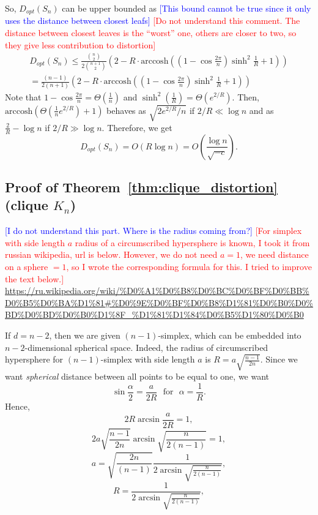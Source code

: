 \documentclass{article} %
\newcommand{\ph}[1]{\textcolor{blue}{#1}}
\newcommand{\lt}[1]{\textcolor{red}{#1}}
\begin{document}
So, $D_{opt}(S_n)$ can be upper bounded as \ph{[This bound cannot be true since it only uses the distance between closest leafs]} \lt{[Do not understand this comment. The distance between closest leaves is the ``worst'' one, others are closer to two, so they give less contribution to distortion]}
\begin{multline*}
D_{opt}(S_n) \le \frac{{n \choose 2}}{2{n+1\choose 2}} \left(2 - R\cdot \mathrm{arccosh}\left( \left(1 - \cos \frac{2 \pi}{n}\right)\sinh^2\frac{1}{R}  + 1 \right)\right) \\
= \frac{(n-1)}{2(n+1)} \left(2 - R\cdot \mathrm{arccosh}\left( \left(1 - \cos \frac{2 \pi}{n}\right)\sinh^2\frac{1}{R}  + 1 \right)\right)
\end{multline*}
Note that $1 - \cos\frac{2\pi}{n} = \Theta\left(\frac{1}{n}\right)$ and $\sinh^2\left(\frac{1}{R}\right) = \Theta\left(e^{2/R}\right)$.
Then, $\textrm{arccosh}\left(\Theta\left(\frac{1}{n} e^{2/R}\right) + 1 \right)$ behaves as $\sqrt{2e^{2/R}/n}$ if $2/R \ll \log n$ and as $\frac{2}{R} - \log n$ if $2/R \gg \log n$.
Therefore, we get
\[
D_{opt}(S_n) = O\left( R \log n \right) = O\left( \frac{\log n}{\sqrt{-c}} \right).
\]

\subsection{Proof of Theorem~\ref{thm:clique_distortion} (clique $K_n$)}

\ph{[I do not understand this part. Where is the radius coming from?]}
\lt{[For simplex with side length $a$ radius of a circumscribed hypersphere is known, I took it from russian wikipedia, url is below. However, we do not need $a = 1$, we need distance on a sphere $= 1$, so I wrote the corresponding formula for this. I tried to improve the text below.]}
\url{https://ru.wikipedia.org/wiki/%D0%A1%D0%B8%D0%BC%D0%BF%D0%BB%D0%B5%D0%BA%D1%81#%D0%9E%D0%BF%D0%B8%D1%81%D0%B0%D0%BD%D0%BD%D0%B0%D1%8F_%D1%81%D1%84%D0%B5%D1%80%D0%B0}

If $d = n-2$, then we are given $(n-1)$-simplex, which can be embedded into $n-2$-dimensional spherical space. Indeed, the radius of circumscribed hypersphere for $(n-1)$-simplex with side length $a$ is $R = a\sqrt{\frac{n-1}{2n}}$. Since we want \textit{spherical} distance between all points to be equal to one, we want
\[
\sin \frac{\alpha}{2} = \frac{a}{2R} \,\,\text{ for } \,\,\alpha = \frac{1}{R}.
\]
Hence,
\[
2 R \arcsin \frac{a}{2R} = 1,
\]
\[
2 a\sqrt{\frac{n-1}{2n}} \arcsin \sqrt{\frac{n}{2(n-1)}} = 1,
\]
\[
a  = \sqrt{\frac{2n}{(n-1)}}\frac{1}{2\arcsin \sqrt{\frac{n}{2(n-1)}}},
\]
\[
R = \frac{1}{2\arcsin \sqrt{\frac{n}{2(n-1)}}},
\]
\end{document}

